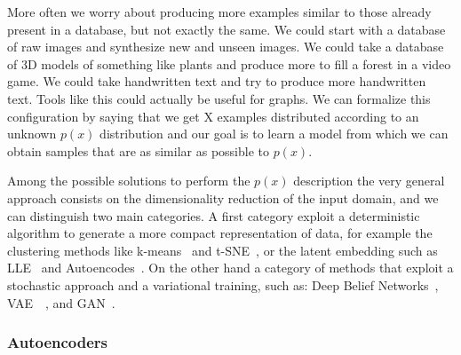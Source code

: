 More often we worry about producing more examples similar to those already present in a database, but not exactly the same. We could start with a database of raw images and synthesize new and unseen images. We could take a database of 3D models of something like plants and produce more to fill a forest in a video game. We could take handwritten text and try to produce more handwritten text. Tools like this could actually be useful for graphs. We can formalize this configuration by saying that we get X examples distributed according to an unknown $p(x)$ distribution and our goal is to learn a model from which we can obtain samples that are as similar as possible to $p(x)$.

Among the possible solutions to perform the $p(x)$ description the very general approach consists on the dimensionality reduction of the input domain, and we can distinguish two main categories. A first category exploit a deterministic algorithm to generate a more compact representation of data, for example the clustering methods like k-means~\cite{Kanungo00anefficient} and t-SNE~\cite{vanDerMaaten2008}, or the latent embedding such as LLE~\cite{Roweis2000} and Autoencodes~\cite{Goodfellow-et-al-2016}.
On the other hand a category of methods that exploit a stochastic approach and a variational training, such as: Deep Belief Networks~\cite{hinton_DBN}, \ac{VAE}~\cite{DBLP:journals/corr/KingmaW13}~\cite{DBLP:conf/iclr/2014}, and GAN~\cite{Goodfellow:2014:GAN:2969033.2969125}.

\subsubsection{Autoencoders}

